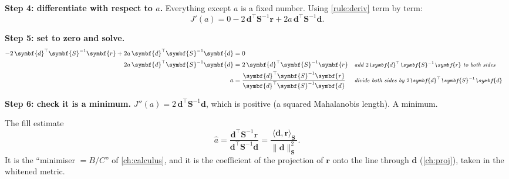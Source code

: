 \documentclass[11pt,a4paper,oneside,openany]{book}
\newcommand{\B}[1]{{\symbf{#1}}}
\newcommand{\B}[1]{{\bm{#1}}}
\newcommand{\T}{^{\top}}
\newcommand{\nrm}[1]{\lVert #1\rVert}
\newcommand{\vr}{\B{r}}
\newcommand{\vd}{\B{d}}
\newcommand{\mS}{\B{S}}
\newcommand{\ahat}{\hat a}
\newcommand{\why}[1]{&&\text{\small\itshape #1}}
\begin{document}
\textbf{Step 4: differentiate with respect to $a$.} Everything except $a$ is a fixed number. Using \cref{rule:deriv} term by term:
\[
  J'(a)=0-2\,\vd\T\mS^{-1}\vr+2a\,\vd\T\mS^{-1}\vd .
\]

\textbf{Step 5: set to zero and solve.}
\begin{align*}
-2\,\vd\T\mS^{-1}\vr+2a\,\vd\T\mS^{-1}\vd &= 0\\
2a\,\vd\T\mS^{-1}\vd &= 2\,\vd\T\mS^{-1}\vr \why{add $2\vd\T\mS^{-1}\vr$ to both sides}\\
a &= \frac{\vd\T\mS^{-1}\vr}{\vd\T\mS^{-1}\vd} \why{divide both sides by $2\vd\T\mS^{-1}\vd$}
\end{align*}

\textbf{Step 6: check it is a minimum.} $J''(a)=2\,\vd\T\mS^{-1}\vd$, which is positive (a squared Mahalanobis length). A minimum.

\begin{rulebox}[label=rule:ahat]{The fill estimate}
\[
  \ahat=\frac{\vd\T\mS^{-1}\vr}{\vd\T\mS^{-1}\vd}=\frac{\langle\vd,\vr\rangle_{\mS}}{\nrm{\vd}^2_{\mS}} .
\]
It is the ``minimiser $=B/C$'' of \cref{ch:calculus}, and it is the coefficient of the projection of $\vr$ onto the line through $\vd$
(\cref{ch:proj}), taken in the whitened metric.
\end{rulebox}
\end{document}
